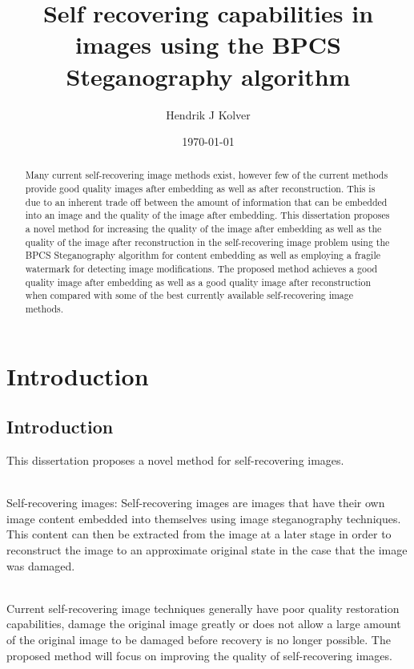 \documentclass[12pt]{article}
\title{Self recovering capabilities in images using the BPCS Steganography algorithm}
\author{Hendrik J Kolver}
\date{\today}
\begin{document}
\maketitle

\begin{abstract}

\noindent 
Many current self-recovering image methods exist, however few of the current methods provide good quality images after embedding as well as after reconstruction.
This is due to an inherent trade off between the amount of information that can be embedded into an image and the quality of the image after embedding.
This dissertation proposes a novel method for increasing the quality of the image after embedding as well as the quality of the image after reconstruction in the self-recovering image problem using the BPCS Steganography algorithm for content embedding as well as employing a fragile watermark for detecting image modifications.
The proposed method achieves a good quality image after embedding as well as a good quality image after reconstruction when compared with some of the best currently available self-recovering image methods. 

\end{abstract}

\tableofcontents
\section{Introduction}

\subsection{Introduction}
This dissertation proposes a novel method for self-recovering images.

\hspace{0pt} \\
Self-recovering images: Self-recovering images are images that have their own image content embedded into themselves using image steganography techniques. 
This content can then be extracted from the image at a later stage in order to reconstruct the image to an approximate original state in the case that the image was damaged.

\hspace{0pt} \\
Current self-recovering image techniques generally have poor quality restoration capabilities, damage the original image greatly or does not allow a large amount of the original image to be damaged before recovery is no longer possible.
The proposed method will focus on improving the quality of self-recovering images.
\end{document}
